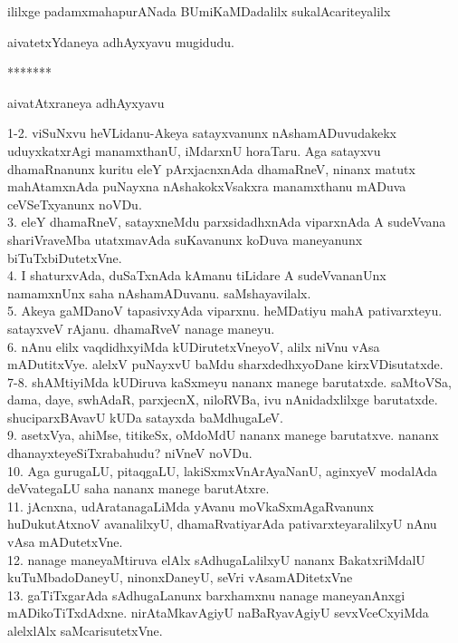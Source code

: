 \documentclass{article}
\begin{document}
\begin{center}
ililxge padamxmahapurANada BUmiKaMDadalilx sukalAcariteyalilx
\end{center}

\begin{center}
aivatetxYdaneya adhAyxyavu mugidudu.
\end{center}

\begin{center}
*******
\end{center}

\begin{center}
aivatAtxraneya adhAyxyavu
\end{center}

1-2. viSuNxvu heVLidanu-Akeya satayxvanunx nAshamADuvudakekx uduyxkatxrAgi manamxthanU, iMdarxnU horaTaru. Aga satayxvu dhamaRnanunx kuritu eleY pArxjacnxnAda dhamaRneV, ninanx matutx mahAtamxnAda puNayxna nAshakokxVsakxra manamxthanu mADuva ceVSeTxyanunx noVDu.\\
3. eleY dhamaRneV, satayxneMdu parxsidadhxnAda viparxnAda A sudeVvana shariVraveMba utatxmavAda suKavanunx koDuva maneyanunx biTuTxbiDutetxVne.\\
4. I shaturxvAda, duSaTxnAda kAmanu tiLidare A sudeVvananUnx namamxnUnx saha nAshamADuvanu. saMshayavilalx.\\
5. Akeya gaMDanoV tapasivxyAda viparxnu. heMDatiyu mahA pativarxteyu. satayxveV rAjanu. dhamaRveV nanage maneyu.\\
6. nAnu elilx vaqdidhxyiMda kUDirutetxVneyoV, alilx niVnu vAsa mADutitxVye. alelxV puNayxvU baMdu sharxdedhxyoDane kirxVDisutatxde.\\
7-8. shAMtiyiMda kUDiruva kaSxmeyu nananx manege barutatxde. saMtoVSa, dama, daye, swhAdaR, parxjecnX, niloRVBa, ivu nAnidadxlilxge barutatxde. shuciparxBAvavU kUDa satayxda baMdhugaLeV.\\
9. asetxVya, ahiMse, titikeSx, oMdoMdU nananx manege barutatxve. nananx dhanayxteyeSiTxrabahudu? niVneV noVDu.\\
10. Aga gurugaLU, pitaqgaLU, lakiSxmxVnArAyaNanU, aginxyeV modalAda deVvategaLU saha nananx manege barutAtxre.\\
11. jAcnxna, udAratanagaLiMda yAvanu moVkaSxmAgaRvanunx huDukutAtxnoV avanalilxyU, dhamaRvatiyarAda pativarxteyaralilxyU nAnu vAsa mADutetxVne.\\
12. nanage maneyaMtiruva elAlx sAdhugaLalilxyU nananx BakatxriMdalU kuTuMbadoDaneyU, ninonxDaneyU, seVri vAsamADitetxVne\\
13. gaTiTxgarAda sAdhugaLanunx barxhamxnu nanage maneyanAnxgi mADikoTiTxdAdxne. nirAtaMkavAgiyU naBaRyavAgiyU sevxVceCxyiMda alelxlAlx saMcarisutetxVne.\\
\end{document}
